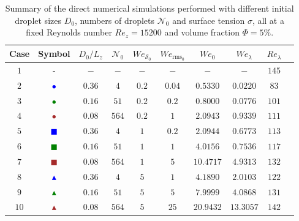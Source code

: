 \begin{table}
\centering
\setlength{\tabcolsep}{5pt}
\begin{tabular}{cccccccccc}

Case	&	Symbol	&	$D_0/L_z$	&	$\mathcal{N}_0$	&	$We_{\mathcal{S}_0}$	&	$We_{\textrm{rms}_0}$	&	$We_0$	&	$We_\lambda$	&	$Re_\lambda$	\\
\hline
$1$	&	-	&	$-$		&	$-$		&	$-$		&	$-$		&	$-$				&	$-$				&	$145$	\\
$2$	&	\textcolor{blue}{\large $\bullet$}	&	$0.36$	&	$4$		&	$0.2$	&	$0.04$	&	$0.5330$		&	$0.0220$		&	$83$	\\
$3$	&	\textcolor{green}{\large $\bullet$}	&	$0.16$	&	$51$		&	$0.2$	&	$0.2$	&	$0.8000$		&	$0.0776$		&	$101$	\\
$4$	&	\textcolor{brown}{\large $\bullet$}	&	$0.08$	&	$564$	&	$0.2$	&	$1$		&	$2.0943$		&	$0.9339$		&	$111$	\\
$5$	&	\textcolor{blue}{\tiny $\blacksquare$}	&	$0.36$	&	$4$		&	$1$		&	$0.2$	&	$2.0944$		&	$0.6773$		&	$113$	\\
$6$	&	\textcolor{green}{\tiny $\blacksquare$}	&	$0.16$	&	$51$		&	$1$		&	$1$		&	$4.0156$		&	$0.7536$		&	$117$	\\
$7$	&	\textcolor{brown}{\tiny $\blacksquare$}	&	$0.08$	&	$564$	&	$1$		&	$5$		&	$10.4717$		&	$4.9313$		&	$132$	\\
$8$	&	\textcolor{blue}{$\blacktriangle$}	&	$0.36$	&	$4$		&	$5$		&	$1$		&	$4.1890$		&	$2.0103$		&	$122$	\\
$9$	&	\textcolor{green}{$\blacktriangle$}	&	$0.16$	&	$51$		&	$5$		&	$5$		&	$7.9999$		&	$4.0868$		&	$131$	\\
$10$	&	\textcolor{brown}{$\blacktriangle$}	&	$0.08$	& 	$564$	&	$5$		&	$25$	&	$20.9432$	&	$13.3057$	&	$142$

\end{tabular}
\caption{Summary of the direct numerical simulations performed with different initial droplet sizes $D_0$, numbers of droplets $\mathcal{N}_0$ and surface tension $\sigma$, all at a fixed Reynolds number $Re_z = 15200$ and volume fraction $\Phi = 5\%$.}
\label{tab:cases}
\end{table}

